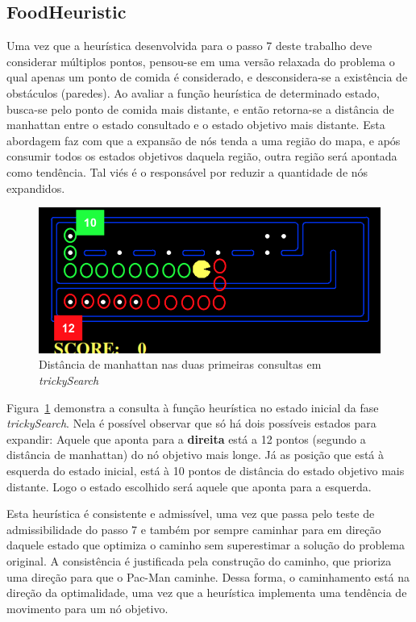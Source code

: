 \documentclass[12pt]{article}
\begin{document}
\subsection{FoodHeuristic}
Uma vez que a heurística desenvolvida para o passo 7 deste trabalho deve
considerar múltiplos pontos, pensou-se em uma versão relaxada do problema
o qual apenas um ponto de comida é considerado, e desconsidera-se a existência
de obstáculos (paredes).
Ao avaliar a função heurística de determinado estado, busca-se pelo ponto de
comida mais distante, e então retorna-se a distância de manhattan entre o estado
consultado e o estado objetivo mais distante.
Esta abordagem faz com que a expansão de nós tenda a uma região do mapa, e após
consumir todos os estados objetivos daquela região, outra região será apontada
como tendência.
Tal viés é o responsável por reduzir a quantidade de nós expandidos.

\begin{figure}[hbt!]
  \centering
  \includegraphics[width=.8\textwidth]{fig/manhattan.png}
  \caption{Distância de manhattan nas duas primeiras consultas em \textit{trickySearch}}
  \label{fig:manhattan}
\end{figure}

Figura~\ref{fig:manhattan} demonstra a consulta à função heurística no estado
inicial da fase \textit{trickySearch}.
Nela é possível observar que só há dois possíveis estados para expandir:
Aquele que aponta para a \textbf{direita} está a 12 pontos (segundo a
distância de manhattan) do nó objetivo mais longe.
Já as posição que está à esquerda do estado inicial, está à 10 pontos de
distância do estado objetivo mais distante.
Logo o estado escolhido será aquele que aponta para a esquerda.

Esta heurística é consistente e admissível, uma vez que passa pelo teste
de admissibilidade do passo 7 e também por sempre caminhar para em direção
daquele estado que optimiza o caminho sem superestimar a solução do problema
original.
A consistência é justificada pela construção do caminho, que prioriza uma direção
para que o Pac-Man caminhe.
Dessa forma, o caminhamento está na direção da optimalidade, uma vez que a
heurística implementa uma tendência de movimento para um nó objetivo.
\end{document}
